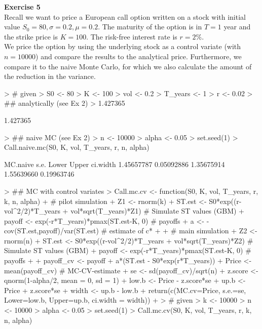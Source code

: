 \documentclass{article}
\begin{document}
\newpage
\textbf{Exercise 5} \\
Recall we want to price a European call option written on a stock with initial value $S_0 = 80, \sigma = 0.2, \mu = 0.2$. The maturity of the option is in $T = 1$ year and the strike price is $K = 100$. The risk-free interest rate is $r = 2\%$.\\
We price the option by using the underlying stock as a control variate (with $n = 10000$) and compare the results to the analytical price. Furthermore, we compare it to the naive Monte Carlo, for which we also calculate the amount of the reduction in the variance.
\begin{Schunk}
\begin{Sinput}
> # given
> S0 <- 80
> K <- 100
> vol <- 0.2
> T_years <- 1
> r <- 0.02
> ## analytically (see Ex 2)
> 1.427365
\end{Sinput}
\begin{Soutput}
[1] 1.427365
\end{Soutput}
\begin{Sinput}
> ## naive MC (see Ex 2)
> n <- 10000
> alpha <- 0.05
> set.seed(1)
> Call.naive.mc(S0, K, vol, T_years, r, n, alpha)
\end{Sinput}
\begin{Soutput}
  MC.naive       s.e.      Lower      Upper   ci.width 
1.45657787 0.05092886 1.35675914 1.55639660 0.19963746 
\end{Soutput}
\begin{Sinput}
> ## MC with control variates
> Call.mc.cv <- function(S0, K, vol, T_years, r, k, n, alpha) {
+   # pilot simulation
+   Z1 <- rnorm(k)
+   ST.est <- S0*exp((r-vol^2/2)*T_years + vol*sqrt(T_years)*Z1)  # Simulate ST values (GBM)
+   payoff <- exp(-r*T_years)*pmax(ST.est-K, 0) # payoffs 
+   a <- -cov(ST.est,payoff)/var(ST.est) # estimate of c*
+   
+   # main simulation
+   Z2 <- rnorm(n)
+   ST.est <- S0*exp((r-vol^2/2)*T_years + vol*sqrt(T_years)*Z2)  # Simulate ST values (GBM)
+   payoff <- exp(-r*T_years)*pmax(ST.est-K, 0) # payoffs 
+   
+   payoff_cv <- payoff + a*(ST.est - S0*exp(r*T_years))
+   Price <- mean(payoff_cv) # MC-CV-estimate
+   se <- sd(payoff_cv)/sqrt(n)
+   z.score <- qnorm(1-alpha/2, mean = 0, sd = 1)
+   low.b <- Price - z.score*se
+   up.b <- Price + z.score*se
+   width <- up.b - low.b
+   return(c(MC.cv=Price, s.e.=se, Lower=low.b, Upper=up.b, ci.width = width))
+ }
> # given
> k <- 10000
> n <- 10000
> alpha <- 0.05
> set.seed(1)
> Call.mc.cv(S0, K, vol, T_years, r, k, n, alpha)
\end{Sinput}

\end{Schunk}
\end{document}
